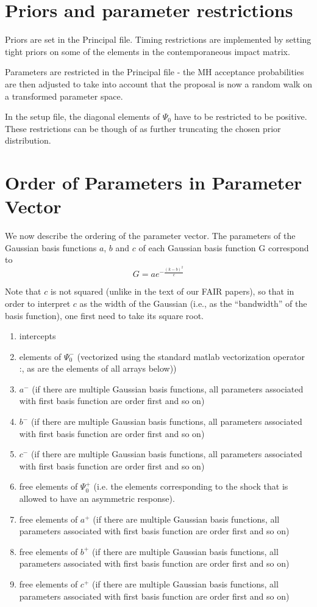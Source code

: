 \documentclass[a4paper,12pt]{article}
\begin{document}
\section{Priors and parameter restrictions} 
Priors are set in the Principal file. Timing restrictions are implemented by setting tight priors on some of the elements in the contemporaneous impact matrix.

Parameters are restricted in the Principal file - the MH acceptance probabilities are then adjusted to take into account that the proposal is now a random walk on a transformed parameter space. 

In the setup file, the diagonal elements of $\Psi_0$ have to be restricted to be positive. These restrictions can be though of as further truncating the chosen prior distribution.

\section{Order of Parameters in Parameter Vector}

We now describe the ordering of the parameter vector. The parameters of the Gaussian basis functions $a$, $b$ and $c$ of each Gaussian basis function G correspond to \[
G=ae^{-\frac{(k-b)^{2}}{c}}
\]%

Note that $c$ is not squared (unlike in the text of our FAIR papers), so that in order to interpret $c$ as the width of the Gaussian (i.e., as the ``bandwidth'' of the basis function), one first need to take its square root.

\begin{enumerate}
  \item intercepts
  \item elements of $\Psi_0^-$ (vectorized using the standard matlab vectorization operator :, as are the elements of all arrays below))
  \item $a^-$ (if there are multiple Gaussian basis functions, all parameters associated with first basis function are order first and so on)
  \item $b^-$ (if there are multiple Gaussian basis functions, all parameters associated with first basis function are order first and so on)
  \item $c^-$ (if there are multiple Gaussian basis functions, all parameters associated with first basis function are order first and so on)
  \item free elements of $\Psi_0^+$ (i.e. the elements corresponding to the shock that is allowed to have an asymmetric response).
  \item free elements of $a^+$ (if there are multiple Gaussian basis functions, all parameters associated with first basis function are order first and so on)
  \item free elements of $b^+$ (if there are multiple Gaussian basis functions, all parameters associated with first basis function are order first and so on)
  \item free elements of $c^+$ (if there are multiple Gaussian basis functions, all parameters associated with first basis function are order first and so on)
\end{enumerate}
\end{document}
